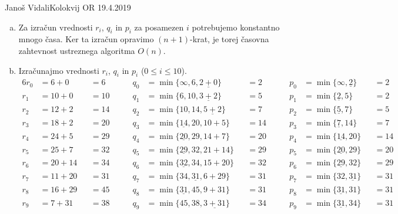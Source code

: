 \begin{naloga}{Janoš Vidali}{Kolokvij OR 19.4.2019}
\begin{odgovor}
\begin{enumerate}[(a)]
\item Za izračun vrednosti $r_i$, $q_i$ in $p_i$ za posamezen $i$
potrebujemo konstantno mnogo časa.
Ker ta izračun opravimo $(n+1)$-krat,
je torej časovna zahtevnost ustreznega algoritma $O(n)$.

\item Izračunajmo vrednosti $r_i$, $q_i$ in $p_i$ ($0 \le i \le 10$).
\begin{alignat*}{6}
r_0    &= 6+0                                   &&= 6  &\qquad
q_0    &= \min\{\infty, 6, \underline{2+0}\}    &&= 2  &\qquad
p_0    &= \min\{\infty, \underline{2}\}         &&= 2  \\
r_1    &= 10+0                                  &&= 10 &\qquad
q_1    &= \min\{6, 10, \underline{3+2}\}        &&= 5  &\qquad
p_1    &= \min\{\underline{2}, 5\}              &&= 2  \\
r_2    &= 12+2                                  &&= 14 &\qquad
q_2    &= \min\{10, 14, \underline{5+2}\}       &&= 7  &\qquad
p_2    &= \min\{\underline{5}, 7\}              &&= 5  \\
r_3    &= 18+2                                  &&= 20 &\qquad
q_3    &= \min\{\underline{14}, 20, 10+5\}      &&= 14 &\qquad
p_3    &= \min\{\underline{7}, 14\}             &&= 7  \\
r_4    &= 24+5                                  &&= 29 &\qquad
q_4    &= \min\{\underline{20}, 29, 14+7\}      &&= 20 &\qquad
p_4    &= \min\{\underline{14}, 20\}            &&= 14 \\
r_5    &= 25+7                                  &&= 32 &\qquad
q_5    &= \min\{\underline{29}, 32, 21+14\}     &&= 29 &\qquad
p_5    &= \min\{\underline{20}, 29\}            &&= 20 \\
r_6    &= 20+14                                 &&= 34 &\qquad
q_6    &= \min\{\underline{32}, 34, 15+20\}     &&= 32 &\qquad
p_6    &= \min\{\underline{29}, 32\}            &&= 29 \\
r_7    &= 11+20                                 &&= 31 &\qquad
q_7    &= \min\{34, \underline{31}, 6+29\}      &&= 31 &\qquad
p_7    &= \min\{32, \underline{31}\}            &&= 31 \\
r_8    &= 16+29                                 &&= 45 &\qquad
q_8    &= \min\{\underline{31}, 45, 9+31\}      &&= 31 &\qquad
p_8    &= \min\{\underline{31}, 31\}            &&= 31 \\
r_9    &= 7+31                                  &&= 38 &\qquad
q_9    &= \min\{45, 38, \underline{3+31}\}      &&= 34 &\qquad
p_9    &= \min\{\underline{31}, 34\}            &&= 31 \\

\end{alignat*}
\end{enumerate}
\end{odgovor}
\end{naloga}
